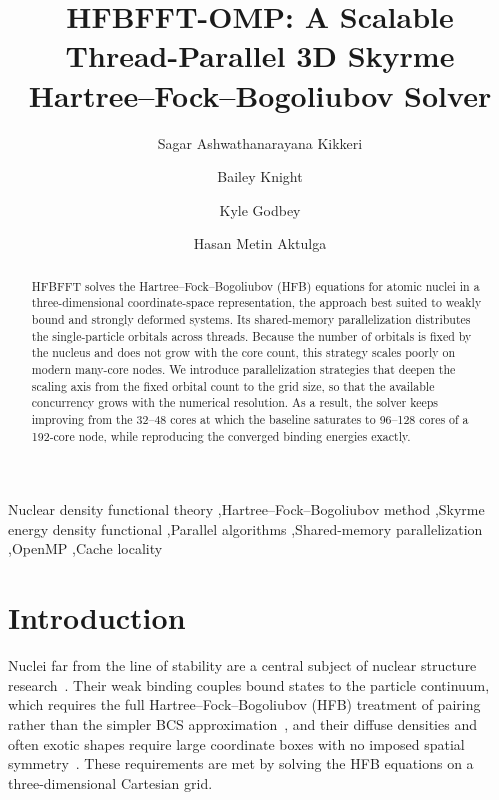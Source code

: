 \documentclass[preprint,12pt]{elsarticle}
\numberwithin{equation}{section}
\begin{document}
\begin{frontmatter}
\title{HFBFFT-OMP: A Scalable Thread-Parallel 3D Skyrme Hartree--Fock--Bogoliubov Solver}

\author[msu]{Sagar Ashwathanarayana Kikkeri}
\author[msu]{Bailey Knight}
\author[msu]{Kyle Godbey}
\author[msu]{Hasan Metin Aktulga}
\address[msu]{Department of Computer Science and Engineering, Michigan State University, East Lansing, Michigan 48824, USA}

\begin{abstract}
HFBFFT solves the Hartree--Fock--Bogoliubov (HFB) equations for atomic nuclei in a three-dimensional coordinate-space representation, the approach best suited to weakly bound and strongly deformed systems. Its shared-memory parallelization distributes the single-particle orbitals across threads. Because the number of orbitals is fixed by the nucleus and does not grow with the core count, this strategy scales poorly on modern many-core nodes. We introduce parallelization strategies that deepen the scaling axis from the fixed orbital count to the grid size, so that the available concurrency grows with the numerical resolution. As a result, the solver keeps improving from the 32--48 cores at which the baseline saturates to 96--128 cores of a 192-core node, while reproducing the converged binding energies exactly.
\end{abstract}

\begin{keyword}
Nuclear density functional theory \sep Hartree--Fock--Bogoliubov method \sep Skyrme energy density functional \sep Parallel algorithms \sep Shared-memory parallelization \sep OpenMP \sep Cache locality
\end{keyword}
\end{frontmatter}

\section{Introduction}\label{sec:intro}

Nuclei far from the line of stability are a central subject of nuclear structure research~\cite{erler2012}. Their weak binding couples bound states to the particle continuum, which requires the full Hartree--Fock--Bogoliubov (HFB) treatment of pairing rather than the simpler BCS approximation~\cite{dobaczewski1984}, and their diffuse densities and often exotic shapes require large coordinate boxes with no imposed spatial symmetry~\cite{bender}. These requirements are met by solving the HFB equations on a three-dimensional Cartesian grid.
\end{document}
